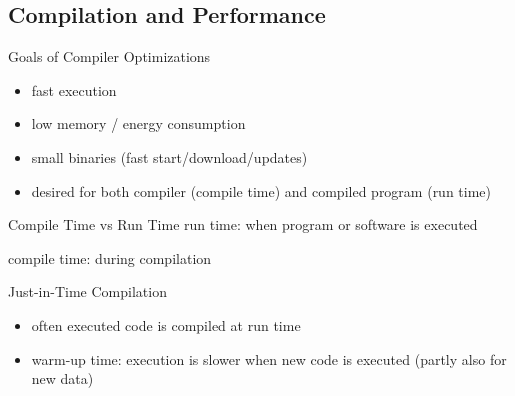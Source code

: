 \subsection{Compilation and Performance}
\begin{frame}{\insertsubsection}
	\vspace{-10mm}
	\begin{fancycolumns}
		\vspace{15mm}
		\begin{note}{Goals of Compiler Optimizations}
			\begin{itemize}
				\item fast execution
				\item low memory / energy consumption
				\item small binaries (fast start/download/updates)
				\item desired for both compiler (compile time) and compiled program (run time)
			\end{itemize}
		\end{note}


		\begin{definition}{Compile Time vs Run Time}
			run time: when program or software is executed

			compile time: during compilation
		\end{definition}
		\nextcolumn
		\hfill\resizebox{60mm}{!}{\figJIT}

		\begin{definition}{Just-in-Time Compilation}
			\begin{itemize}
				\item often executed code is compiled at run time
				\item warm-up time: execution is slower when new code is executed (partly also for new data)
			\end{itemize}
		\end{definition}
	\end{fancycolumns}
\end{frame}

